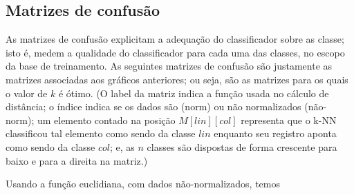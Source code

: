 \documentclass[10pt,a4paper,twocolumn]{article}
\begin{document}
    \subsection{Matrizes de confusão}

      As matrizes de confusão explicitam a adequação do classificador sobre as
      classe; isto é, medem a qualidade do classificador para cada uma das
      classes, no escopo da base de treinamento. As seguintes matrizes de
      confusão são justamente as matrizes associadas aos gráficos anteriores;
      ou seja, são as matrizes para os quais o valor de $k$ é ótimo.
      (O label da matriz indica a função usada no cálculo de distância; 
      o índice indica se os dados são (norm) ou não normalizados (não-norm);
      um elemento contado na posição $M[lin][col]$ representa que o k-NN
      classificou tal elemento como sendo da classe $lin$ enquanto seu registro
      aponta como sendo da classe $col$; e, as $n$ classes são dispostas de
      forma crescente para baixo e para a direita na matriz.)

      Usando a função euclidiana, com dados não-normalizados, temos
      
\end{document}
